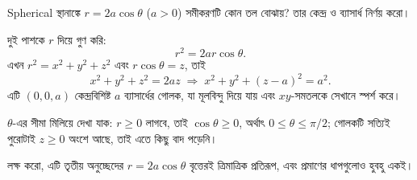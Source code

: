 \documentclass[11pt]{article}
\begin{document}
 Spherical স্থানাঙ্কে $r = 2a\cos\theta$ ($a > 0$) সমীকরণটি কোন তল
বোঝায়? তার কেন্দ্র ও ব্যাসার্ধ নির্ণয় করো।

\begin{sol}
দুই পাশকে $r$ দিয়ে গুণ করি:
\[
  r^{2} = 2ar\cos\theta .
\]
এখন $r^{2} = x^{2}+y^{2}+z^{2}$ এবং $r\cos\theta = z$, তাই
\[
  x^{2}+y^{2}+z^{2} = 2az
  \;\Longrightarrow\; x^{2}+y^{2}+(z-a)^{2} = a^{2} .
\]
এটি $(0,0,a)$ কেন্দ্রবিশিষ্ট $a$ ব্যাসার্ধের গোলক, যা মূলবিন্দু দিয়ে যায় এবং
$xy$-সমতলকে সেখানে স্পর্শ করে।

$\theta$-এর সীমা মিলিয়ে দেখা যাক: $r \geq 0$ লাগবে, তাই $\cos\theta \geq 0$,
অর্থাৎ $0 \leq \theta \leq \pi/2$; গোলকটি সত্যিই পুরোটাই $z \geq 0$ অংশে আছে,
তাই এতে কিছু বাদ পড়েনি।

লক্ষ করো, এটি তৃতীয় অনুচ্ছেদের $r = 2a\cos\theta$ বৃত্তেরই ত্রিমাত্রিক প্রতিরূপ,
এবং প্রমাণের ধাপগুলোও হুবহু একই।
\end{sol}
\end{document}
